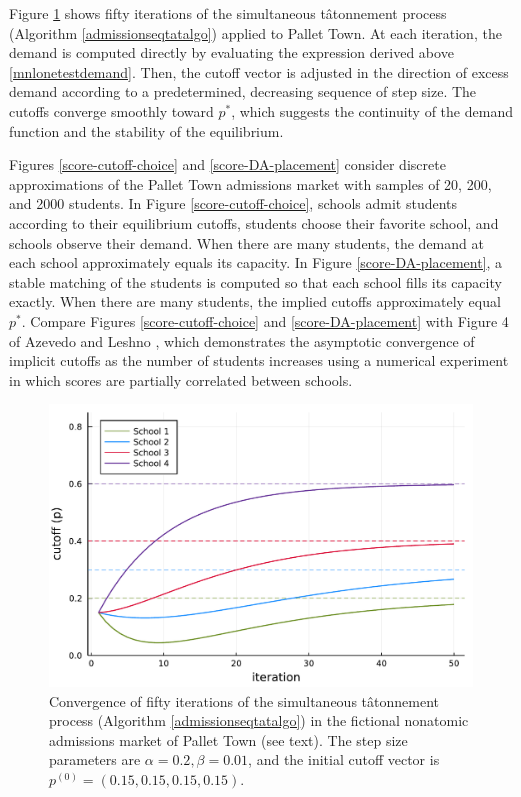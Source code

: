 \documentclass[12pt]{article}
\theoremstyle{definition}
\begin{document}
Figure \ref{tat-iter-cutoff} shows fifty iterations of the simultaneous t\^{a}tonnement process (Algorithm \ref{admissionseqtatalgo}) applied to Pallet Town. At each iteration, the demand is computed directly by evaluating the expression derived above \eqref{mnlonetestdemand}. Then, the cutoff vector is adjusted in the direction of excess demand according to a predetermined, decreasing sequence of step size. The cutoffs converge smoothly toward $p^*$, which suggests the continuity of the demand function and the stability of the equilibrium. 

Figures \ref{score-cutoff-choice} and \ref{score-DA-placement} consider discrete approximations of the Pallet Town admissions market with samples of 20, 200, and 2000 students. In Figure \ref{score-cutoff-choice}, schools admit students according to their equilibrium cutoffs, students choose their favorite school, and schools observe their demand. When there are many students, the demand at each school approximately equals its capacity. In Figure \ref{score-DA-placement}, a stable matching of the students is computed so that each school fills its capacity exactly. When there are many students, the implied cutoffs approximately equal $p^*$. Compare Figures \ref{score-cutoff-choice} and \ref{score-DA-placement} with Figure 4 of Azevedo and Leshno \parencite*{supplydemandfw}, which demonstrates the asymptotic convergence of implicit cutoffs as the number of students increases using a numerical experiment in which scores are partially correlated between schools. 

\begin{figure}
\begin{center}\includegraphics[width=\linewidth, ]{plots/tat-iter-cutoff.pdf}\end{center}
\captionsetup{singlelinecheck=off}
    \caption[.]{Convergence of fifty iterations of the simultaneous t\^{a}tonnement process (Algorithm \ref{admissionseqtatalgo}) in the fictional nonatomic admissions market of Pallet Town (see text). The step size parameters are $\alpha = 0.2, \beta = 0.01$, and the initial cutoff vector is $p^{(0)} = (0.15, 0.15, 0.15, 0.15)$. }
\label{tat-iter-cutoff}
\end{figure}
\end{document}
